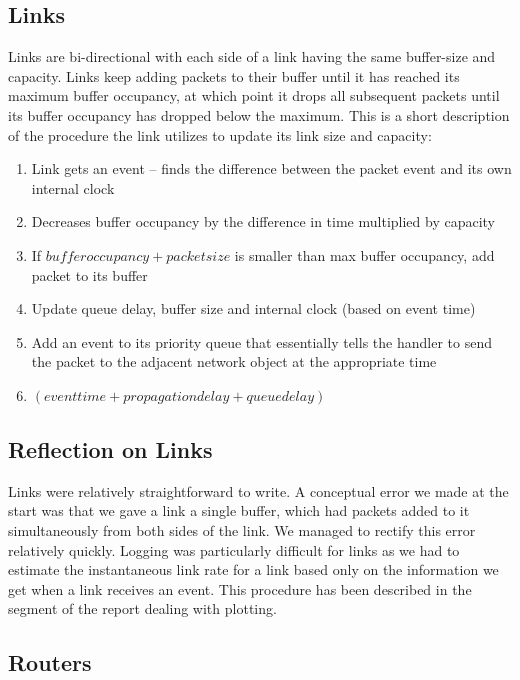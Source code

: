 \documentclass[12pt]{article}
\begin{document}
\subsection{Links}

Links are bi-directional with each side of a link having the same buffer-size and capacity. Links keep adding packets to their buffer until it has reached its maximum buffer occupancy, at which point it drops all subsequent packets until its buffer occupancy has dropped below the maximum. This is a short description of the procedure the link utilizes to update its link size and capacity:

\begin{enumerate}
\item Link gets an event – finds the difference between the packet event and its own internal clock
\item Decreases buffer occupancy by the difference in time multiplied by capacity
\item If $buffer occupancy + packet size$ is smaller than max buffer occupancy, add packet to its buffer
\item Update queue delay, buffer size and internal clock (based on event time)
\item Add an event to its priority queue that essentially tells the handler to send the packet to the adjacent network object at the appropriate time
\item $(event time + propagation delay + queue delay)$
\end{enumerate}

\subsection*{Reflection on Links}

Links were relatively straightforward to write. A conceptual error we made at the start was that we gave a link a single buffer, which had packets added to it simultaneously from both sides of the link. We managed to rectify this error relatively quickly. Logging was particularly difficult for links as we had to estimate the instantaneous link rate for a link based only on the information we get when a link receives an event. This procedure has been described in the segment of the report dealing with plotting. 





\subsection{Routers}
\end{document}
